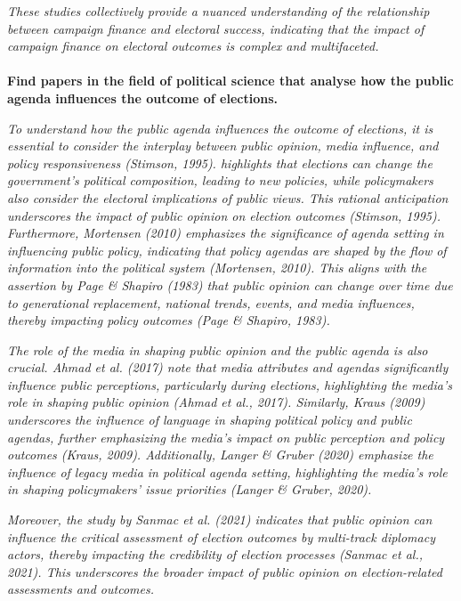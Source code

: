 \documentclass[11pt,a4paper]{article}
\begin{document}
 \textit{These studies collectively provide a nuanced understanding of the relationship between campaign finance and electoral success, indicating that the impact of campaign finance on electoral outcomes is complex and multifaceted.}
\\
\\
 \textbf{Find papers in the field of political science that analyse how the public agenda influences the outcome of elections.}

\textit{To understand how the public agenda influences the outcome of elections, it is essential to consider the interplay between public opinion, media influence, and policy responsiveness (Stimson, 1995). highlights that elections can change the government's political composition, leading to new policies, while policymakers also consider the electoral implications of public views. This rational anticipation underscores the impact of public opinion on election outcomes (Stimson, 1995). Furthermore, Mortensen (2010) emphasizes the significance of agenda setting in influencing public policy, indicating that policy agendas are shaped by the flow of information into the political system (Mortensen, 2010). This aligns with the assertion by Page \& Shapiro (1983) that public opinion can change over time due to generational replacement, national trends, events, and media influences, thereby impacting policy outcomes (Page \& Shapiro, 1983).}

 \textit{The role of the media in shaping public opinion and the public agenda is also crucial. Ahmad et al. (2017) note that media attributes and agendas significantly influence public perceptions, particularly during elections, highlighting the media's role in shaping public opinion (Ahmad et al., 2017). Similarly, Kraus (2009) underscores the influence of language in shaping political policy and public agendas, further emphasizing the media's impact on public perception and policy outcomes (Kraus, 2009). Additionally, Langer \& Gruber (2020) emphasize the influence of legacy media in political agenda setting, highlighting the media's role in shaping policymakers' issue priorities (Langer \& Gruber, 2020).}

 \textit{Moreover, the study by Sanmac et al. (2021) indicates that public opinion can influence the critical assessment of election outcomes by multi-track diplomacy actors, thereby impacting the credibility of election processes (Sanmac et al., 2021). This underscores the broader impact of public opinion on election-related assessments and outcomes.}
\end{document}
